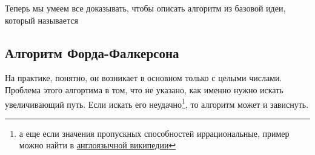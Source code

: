 Теперь мы умеем все доказывать, чтобы описать алгоритм из базовой идеи, который называется
\subsection{Алгоритм Форда-Фалкерсона}
\begin{algorithm}[H]
\DontPrintSemicolon
{}
\end{algorithm}

На практике, понятно, он возникает в основном только с целыми числами. Проблема этого алгортима в том, что не указано, как именно нужно искать увеличивающий путь. Если искать его неудачно\footnote{а еще если значения пропускных способностей иррациональные, пример можно найти в \href{https://en.wikipedia.org/wiki/Ford-Fulkerson_algorithm}{англоязычной википедии}}, то алгоритм может и зависнуть.

